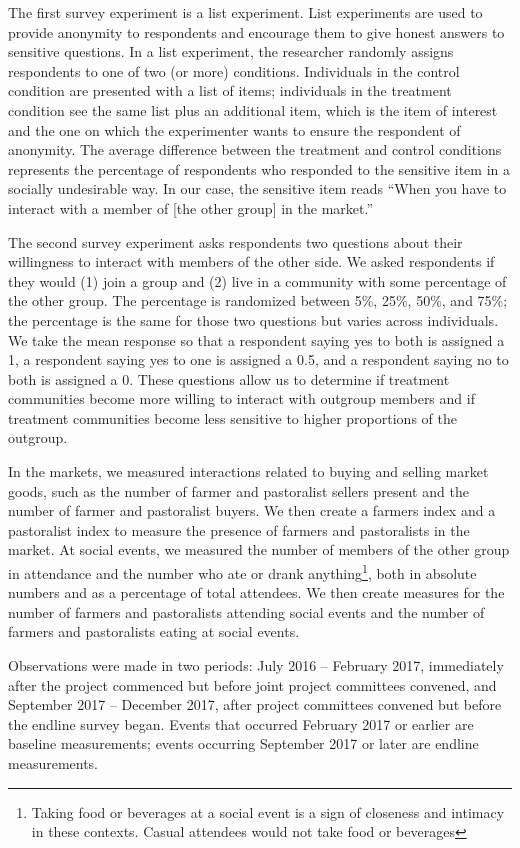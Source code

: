 \documentclass[11pt]{article}
\begin{document}
The first survey experiment is a list experiment. List experiments are
used to provide anonymity to respondents and encourage them to give
honest answers to sensitive questions. In a list experiment, the
researcher randomly assigns respondents to one of two (or more)
conditions. Individuals in the control condition are presented with a
list of items; individuals in the treatment condition see the same list
plus an additional item, which is the item of interest and the one on
which the experimenter wants to ensure the respondent of anonymity. The
average difference between the treatment and control conditions
represents the percentage of respondents who responded to the sensitive
item in a socially undesirable way. In our case, the sensitive item
reads ``When you have to interact with a member of {[}the other group{]}
in the market.''

The second survey experiment asks respondents two questions about their
willingness to interact with members of the other side. We asked
respondents if they would (1) join a group and (2) live in a community
with some percentage of the other group. The percentage is randomized
between 5\%, 25\%, 50\%, and 75\%; the percentage is the same for those
two questions but varies across individuals. We take the mean response
so that a respondent saying yes to both is assigned a 1, a respondent
saying yes to one is assigned a 0.5, and a respondent saying no to both
is assigned a 0. These questions allow us to determine if treatment
communities become more willing to interact with outgroup members and if
treatment communities become less sensitive to higher proportions of the
outgroup.

In the markets, we measured interactions related to buying and selling
market goods, such as the number of farmer and pastoralist sellers
present and the number of farmer and pastoralist buyers. We then create
a farmers index and a pastoralist index to measure the presence of
farmers and pastoralists in the market. At social events, we measured
the number of members of the other group in attendance and the number
who ate or drank anything\footnote{Taking food or beverages at a social
  event is a sign of closeness and intimacy in these contexts. Casual
  attendees would not take food or beverages}, both in absolute numbers
and as a percentage of total attendees. We then create measures for the
number of farmers and pastoralists attending social events and the
number of farmers and pastoralists eating at social events.

Observations were made in two periods: July 2016 -- February 2017,
immediately after the project commenced but before joint project
committees convened, and September 2017 -- December 2017, after project
committees convened but before the endline survey began. Events that
occurred February 2017 or earlier are baseline measurements; events
occurring September 2017 or later are endline measurements.
\end{document}
